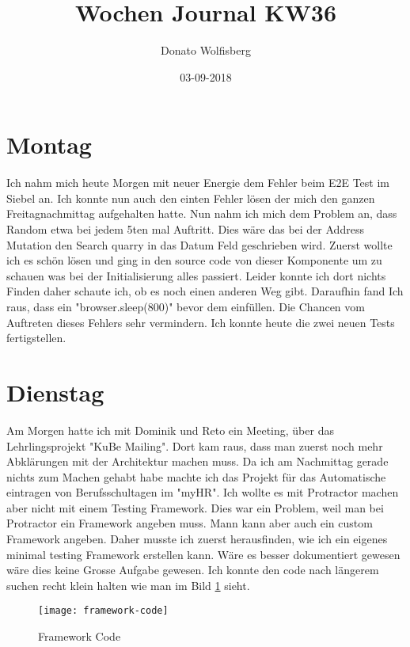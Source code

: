 \documentclass[12pt, titlepage]{article}
\title{Wochen Journal KW36}
\date{03-09-2018}
\author{Donato Wolfisberg}
\begin{document}
  \maketitle

  \tableofcontents
  \newpage


  \section{Montag}
    Ich nahm mich heute Morgen mit neuer Energie dem Fehler beim E2E Test im
Siebel an. Ich konnte nun auch den einten Fehler lösen der mich den
ganzen Freitagnachmittag aufgehalten hatte. Nun nahm ich mich dem Problem
an, dass Random etwa bei jedem 5ten mal Auftritt. Dies wäre das bei der
Address Mutation den Search quarry in das Datum Feld geschrieben wird.
Zuerst wollte ich es schön lösen und ging in den source code von dieser Komponente
um zu schauen was bei der Initialisierung alles passiert. Leider konnte ich
dort nichts Finden daher schaute ich, ob es noch einen anderen Weg gibt.
Daraufhin fand Ich raus, dass ein "browser.sleep(800)" bevor dem einfüllen.
Die Chancen vom Auftreten dieses Fehlers sehr vermindern. Ich konnte
heute die zwei neuen Tests fertigstellen.

  \section{Dienstag}
  Am Morgen hatte ich mit Dominik und Reto ein Meeting, über das Lehr\-lingsprojekt
"KuBe Mailing". Dort kam raus, dass man zuerst noch mehr Abklärungen mit
der Architektur machen muss. Da ich am Nachmittag gerade nichts zum Machen
gehabt habe machte ich das Projekt für das Automatische eintragen von
Berufsschultagen im "myHR". Ich wollte es mit Protractor machen aber nicht mit
einem Testing Framework. Dies war ein Problem, weil man bei Protractor
ein Framework angeben muss. Mann kann aber auch ein custom Framework angeben.
Daher musste ich zuerst herausfinden, wie ich ein eigenes minimal testing Framework
erstellen kann. Wäre es besser dokumentiert gewesen wäre dies keine Grosse Aufgabe gewesen.
Ich konnte den code nach längerem suchen recht klein halten wie man im Bild \ref{fig:framework-code}
sieht.

  \begin{figure}[H]
      \texttt{[image: framework-code]}
      \caption{Framework Code}
      \label{fig:framework-code}
  \end{figure}
\end{document}
